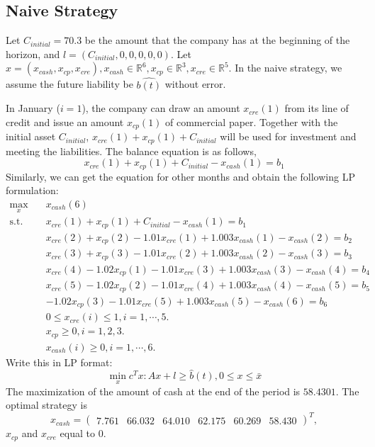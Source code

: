 \documentclass[letterpaper, 10 pt, conference]{ieeeconf}
\begin{document}
\subsection{Naive Strategy}

    Let $C_{initial} = 70.3$ be the amount that the company has at the beginning of the horizon, and $l = (C_{initial}, 0, 0, 0, 0, 0)$. Let $x=(x_{cash}, x_{cp}, x_{cre}), x_{cash}\in\mathbb{R}^6, x_{cp}\in\mathbb{R}^3, x_{cre}\in\mathbb{R}^5$. In the naive strategy, we assume the future liability be $\hat{b(t)}$ without error. 
    
    In January ($i = 1$), the company can draw an amount $x_{cre}(1)$ from its line of credit and issue an amount $x_{cp}(1)$ of commercial paper. Together with the initial asset $C_{initial}$, $x_{cre}(1)+x_{cp}(1)+C_{initial}$ will be used for investment and meeting the liabilities. The balance equation is as follows, 
    \[
        x_{cre}(1)+x_{cp}(1)+C_{initial}-x_{cash}(1) = b_1
    \]
    Similarly, we can get the equation for other months and obtain the following LP formulation:
    \[
        \begin{split}
            \max_{x} \quad & x_{cash}(6) \\
            \text{s.t.} \quad 
            & x_{cre}(1) + x_{cp}(1)+C_{initial}-x_{cash}(1) = b_1 \\
            & x_{cre}(2) + x_{cp}(2) -1.01x_{cre}(1) + 1.003x_{cash}(1) -x_{cash}(2) = b_2 \\
            & x_{cre}(3) + x_{cp}(3) -1.01x_{cre}(2) + 1.003x_{cash}(2) -x_{cash}(3) = b_3 \\
            & x_{cre}(4) - 1.02x_{cp}(1) - 1.01x_{cre}(3) + 1.003x_{cash}(3) - x_{cash}(4) = b_4 \\
            & x_{cre}(5) - 1.02x_{cp}(2) - 1.01x_{cre}(4) + 1.003x_{cash}(4) - x_{cash}(5) = b_5 \\
            & - 1.02x_{cp}(3) - 1.01x_{cre}(5) + 1.003x_{cash}(5) - x_{cash}(6) = b_6 \\
            & 0 \leq x_{cre}(i) \leq 1, i = 1, \cdots, 5.\\
            & x_{cp} \geq 0, i = 1, 2, 3.\\
            & x_{cash}(i)\geq 0, i = 1, \cdots, 6.
        \end{split}
    \]
    Write this in LP format:
    \[
        \min_x c^Tx: Ax+l\geq\hat{b}(t), 0\leq x\leq \bar{x} 
    \]
    The maximization of the amount of cash at the end of the period is $58.4301$. The optimal strategy is 
    \[
        x_{cash} = 
        \begin{pmatrix}
        7.761 & 66.032 & 64.010 & 62.175 & 60.269 & 58.430
        \end{pmatrix}^T,
    \]
    $x_{cp}$ and $x_{cre}$ equal to 0.
    
\end{document}
